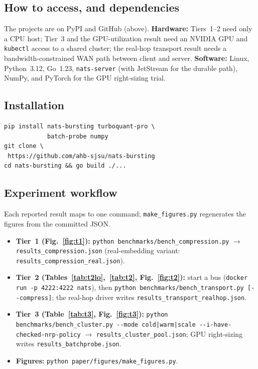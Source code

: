 \documentclass[conference]{IEEEtran}
\begin{document}
\subsection{How to access, and dependencies}
The projects are on PyPI and GitHub (above). \textbf{Hardware:} Tiers~1--2 need only a CPU host;
Tier~3 and the GPU-utilization result need an NVIDIA GPU and \texttt{kubectl} access to a shared
cluster; the real-hop transport result needs a bandwidth-constrained WAN path between client and
server. \textbf{Software:} Linux, Python~3.12, Go~1.23, \texttt{nats-server} (with JetStream for the
durable path), NumPy, and PyTorch for the GPU right-sizing trial.

\subsection{Installation}
\begin{verbatim}
pip install nats-bursting turboquant-pro \
            batch-probe numpy
git clone \
 https://github.com/ahb-sjsu/nats-bursting
cd nats-bursting && go build ./...
\end{verbatim}

\subsection{Experiment workflow}
Each reported result maps to one command; \texttt{make\_figures.py} regenerates the figures from
the committed JSON.
\begin{itemize}\itemsep1pt
\item \textbf{Tier~1 (Fig.~\ref{fig:t1}):} \texttt{python benchmarks/bench\_compression.py}
$\rightarrow$ \texttt{results\_compression.json} (real-embedding variant:
\texttt{results\_compression\_real.json}).
\item \textbf{Tier~2 (Tables~\ref{tab:t2lo},~\ref{tab:t2}, Fig.~\ref{fig:t2}):} start a bus
(\texttt{docker run -p 4222:4222 nats}), then \texttt{python benchmarks/bench\_transport.py
[-{}-compress]}; the real-hop driver writes \texttt{results\_transport\_realhop.json}.
\item \textbf{Tier~3 (Table~\ref{tab:t3}, Fig.~\ref{fig:t3}):} \texttt{python
benchmarks/bench\_cluster.py -{}-mode cold|warm|scale -{}-i-have-checked-nrp-policy} $\rightarrow$
\texttt{results\_cluster\_pool.json}; GPU right-sizing writes \texttt{results\_batchprobe.json}.
\item \textbf{Figures:} \texttt{python paper/\allowbreak figures/\allowbreak make\_figures.py}.
\end{itemize}
\end{document}
